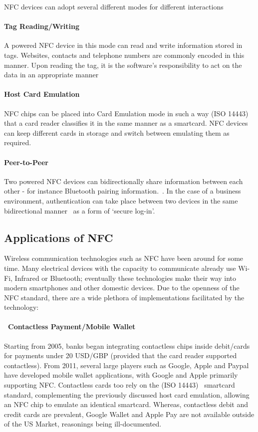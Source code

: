 NFC devices can adopt several different modes for different interactions~\cite{ventata}

\paragraph{Tag Reading/Writing}
A powered NFC device in this mode can read and write information stored in tags. Websites,  contacts and telephone numbers are commonly encoded in this manner. Upon reading the tag, it is the software's responsibility to act on the data in an appropriate manner~\cite{ecosystem}

\paragraph{Host Card Emulation}
NFC chips can be placed into Card Emulation mode in such a way (ISO 14443)~\cite{iso14443} that a card reader classifies it in the same manner as a smartcard. NFC devices can keep different cards in storage and switch between emulating them as required.~\cite{ecosystem}

\paragraph{Peer-to-Peer}
Two powered NFC devices can bidirectionally share information between each other - for instance Bluetooth pairing information.~\cite{ecosystem}. In the case of a business environment, authentication can take place between two devices in the same bidirectional manner~\cite{iso18092} as a form of `secure log-in'.

\clearpage{}
\subsection{Applications of NFC}
Wireless communication technologies such as NFC have been around for some time. Many electrical devices with the capacity to communicate already use Wi-Fi, Infrared or Bluetooth; eventually these technologies make their way into modern smartphones and other domestic devices. Due to the openness of the NFC standard, there are a wide plethora of implementations facilitated by the technology:
\paragraph{\textbullet~Contactless Payment/Mobile Wallet}
Starting from 2005, banks began integrating contactless chips inside debit/cards for payments under 20 USD/GBP (provided that the card reader supported contactless). From 2011, several large players such as Google, Apple and Paypal have developed mobile wallet applications, with Google and Apple primarily supporting NFC. Contactless cards too rely on the (ISO 14443)~\cite{iso14443} smartcard standard, complementing the previously discussed host card emulation, allowing an NFC chip to emulate an identical smartcard. Whereas, contactless debit and credit cards are prevalent, Google Wallet and Apple Pay are not available outside of the US Market, reasonings being ill-documented.
